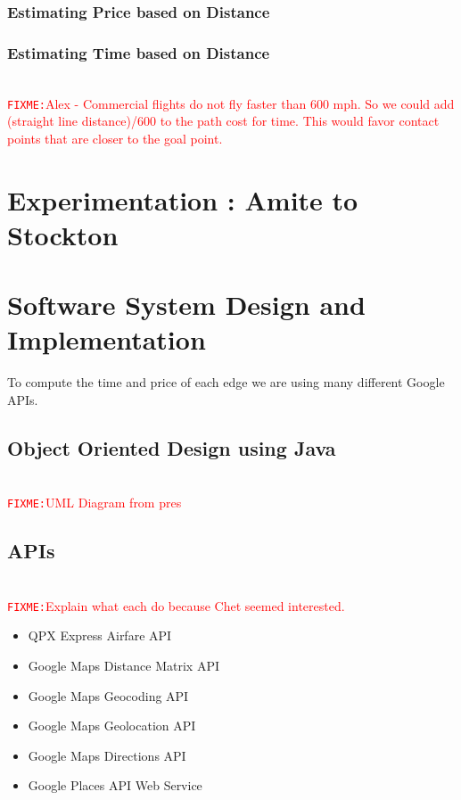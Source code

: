 \documentclass[11pt]{article}
\newcommand{\FIXME}[1]{ \ \\ \hspace* {-1.5 cm}
  \textcolor{red}{\texttt{FIXME:}#1} \medskip\par}
\begin{document}
\subsubsection{Estimating Price based on Distance}

\subsubsection{Estimating Time based on Distance}

\FIXME{Alex - Commercial flights do not fly faster than 600 mph. So we could add (straight line distance)/600 to the path cost for time. This would favor contact points that are closer to the goal point.}

\section{Experimentation : Amite to Stockton}



\section{Software System Design and Implementation}
To compute the time and price of each edge we are using many different Google APIs.

\subsection{Object Oriented Design using Java}

\FIXME{UML Diagram from pres}

\subsection{APIs}

\FIXME{Explain what each do because Chet seemed interested.}
\begin{itemize}
\item QPX Express Airfare API
\item Google Maps Distance Matrix API
\item Google Maps Geocoding API
\item Google Maps Geolocation API
\item Google Maps Directions API
\item Google Places API Web Service
\end{itemize}
\end{document}
